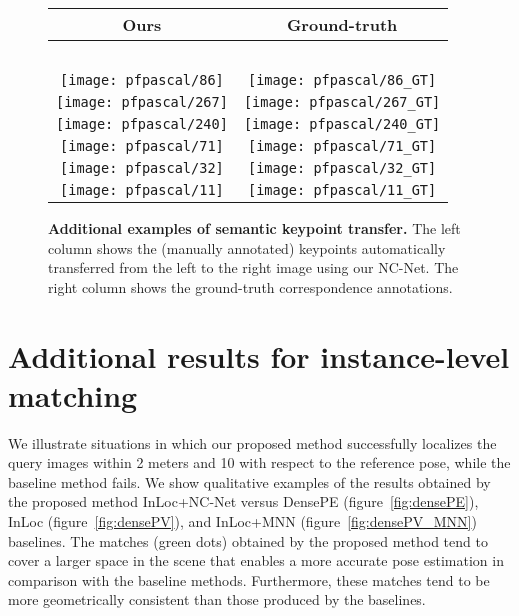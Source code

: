 \documentclass{article}
\begin{document}
\begin{figure}[tbp]
  \centering
  \begingroup
  \renewcommand{\arraystretch}{0.5}
  \begin{tabular}{@{\hskip 1pt}c@{\hskip 6pt}|@{\hskip 6pt}c@{\hskip 1pt}}
    Ours & Ground-truth \\ \hline
    ~ & ~ \\
\texttt{[image: pfpascal/86]}  & 
\texttt{[image: pfpascal/86\_GT]} \\
\texttt{[image: pfpascal/267]}  & 
\texttt{[image: pfpascal/267\_GT]} \\
\texttt{[image: pfpascal/240]}  & 
\texttt{[image: pfpascal/240\_GT]} \\
\texttt{[image: pfpascal/71]}  & 
\texttt{[image: pfpascal/71\_GT]} \\
\texttt{[image: pfpascal/32]}  & 
\texttt{[image: pfpascal/32\_GT]} \\
\texttt{[image: pfpascal/11]}  & 
\texttt{[image: pfpascal/11\_GT]} \\
  \end{tabular}
  \endgroup
  \vspace{2pt}
  \caption{{\bf Additional examples of semantic  keypoint  transfer.} The left column shows the (manually annotated) keypoints automatically transferred from the left to the right image using our NC-Net. The right column shows the ground-truth correspondence annotations.}
  \label{fig:qualPascal2}
\end{figure}



\section{Additional results for instance-level matching\label{apx:inst_level}}
We illustrate situations in which our proposed method successfully localizes the query images within 2 meters and 10 with respect to the reference pose, while the baseline method fails. We show qualitative examples of the results obtained by the proposed method InLoc+NC-Net versus 
DensePE (figure~\ref{fig:densePE}), InLoc (figure~\ref{fig:densePV}), 
and InLoc+MNN (figure~\ref{fig:densePV_MNN}) baselines.
The matches (green dots) obtained by the proposed method tend to cover a larger space in the scene that enables a more accurate pose estimation in comparison with the baseline methods. Furthermore, these matches tend to be more geometrically consistent than those produced by the baselines.
\end{document}

